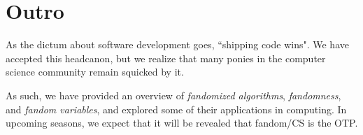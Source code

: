 \documentclass[9pt]{sigplanconf}
\begin{document}
\section{Outro}
As the dictum about software development goes, ``shipping code wins". We have
accepted this headcanon, but we realize that many ponies in the computer
science community remain squicked by it.

As such, we have provided an overview of \emph{fandomized algorithms},
\emph{fandomness}, and \emph{fandom variables}, and explored some of their
applications in computing. In upcoming seasons, we expect that it will be
revealed that fandom/CS is the OTP.



\end{document}
